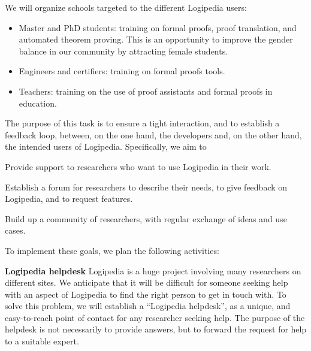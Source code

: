 \begin{workpackage}[id=dissemination,wphases=0-48,type=MGT,
  short=Dissemination,%
  title={Dissemination, communication and exploitation},
  lead=Inr]
\begin{tasklist}
  \begin{task}[id=training,
      title=Training Logipedia developers and users,
      lead=Inr,InrRM=2,IrtRM=2]
    We will organize schools targeted to the different Logipedia users:
    \begin{itemize}
    \item Master and PhD students: training on formal proofs, proof
      translation, and automated theorem proving. This is an
      opportunity to improve the gender balance in our community by
      attracting female students.
    \item Engineers and certifiers: training on formal proofs tools.
    \item Teachers: training on the use of proof assistants and formal
      proofs in education.
    \end{itemize}
  \end{task}

  \begin{task}[id=research-club,
      title=Expanding the use of Logipedia in research,
      lead=Bir,BirRM=2]
    The purpose of this task is to ensure a tight interaction, and to establish a feedback loop, between, on the one hand, the developers and, on the other hand, the intended users of Logipedia.
    Specifically, we aim to 
    \begin{compactenum}
     \item Provide support to researchers who want to use Logipedia in their work.
     \item Establish a forum for researchers to describe their needs, to give feedback on Logipedia, and to request features.
     \item Build up a community of researchers, with regular exchange of ideas and use cases.
    \end{compactenum}
    To implement these goals, we plan the following activities:
    \begin{compactenum}
     \item [\textbf{Logipedia helpdesk}] 
     Logipedia is a huge project involving many researchers on different sites. We anticipate that it will be difficult for someone seeking help with an aspect of Logipedia to find the right person to get in touch with.
     To solve this problem, we will establish a ``Logipedia helpdesk'', as a unique, and easy-to-reach point of contact for any researcher seeking help.
     The purpose of the helpdesk is not necessarily to provide answers, but to forward the request for help to a suitable expert.
     

\end{compactenum}
\end{task}
\end{tasklist}
\end{workpackage}
